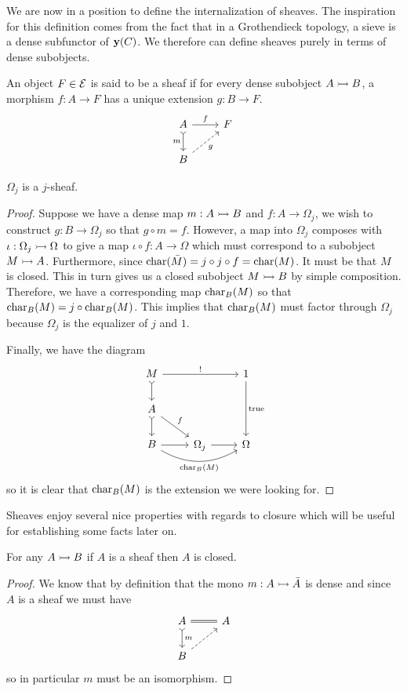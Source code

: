 We are now in a position to define the internalization of sheaves. The
inspiration for this definition comes from the fact that in a
Grothendieck topology, a sieve is a dense subfunctor of
$\mathbf{y}(C)$. We therefore can define sheaves purely in terms of dense
subobjects.

\begin{defn}\label{defn:background:sheaves}
  An object $F \in \mathcal{E}$ is said to be a sheaf if for every dense
  subobject $A \rightarrowtail B$, a morphism $f : A \to F$ has a unique
  extension $g : B \to F$.
  \[
    \begin{tikzcd}
      A \ar[d, rightarrowtail, swap, "m"] \ar[r, "f"] & F\\
      B \ar[ur, dashed, swap, "g"]
    \end{tikzcd}
  \]
\end{defn}
\begin{lem}\label{lem:background:omegajsheaf}
  $\Omega_j$ is a $j$-sheaf.
\end{lem}
\begin{proof}
  Suppose we have a dense map $m : A \rightarrowtail B$ and
  $f : A \to \Omega_j$, we wish to construct $g : B \to \Omega_j$ so
  that $g \circ m = f$. However, a map into $\Omega_j$ composes with
  $\iota : \Omega_j \rightarrowtail \Omega$ to give a map
  $\iota \circ f : A \to \Omega$ which must correspond to a subobject
  $M \rightarrowtail A$. Furthermore, since
  $\operatorname{char}(\bar{M}) = j \circ j \circ f = \operatorname{char}(M)$. It must be that $M$
  is closed. This in turn gives us a closed subobject $M \rightarrowtail B$ by
  simple composition. Therefore, we have a corresponding map
  $\operatorname{char}_B(M)$ so that $\operatorname{char}_B(M) = j \circ \operatorname{char}_B(M)$. This implies
  that $\operatorname{char}_B(M)$ must factor through $\Omega_j$ because $\Omega_j$
  is the equalizer of $j$ and $1$.

  Finally, we have the diagram
  \[
    \begin{tikzcd}
      M \ar[d, rightarrowtail] \ar[rr, "!"] & & 1 \ar[dd, "\true"]\\
      A \ar[d, rightarrowtail] \ar[dr, "f"] & & \\
      B \ar[r] \ar[rr, swap, bend right, "\charmap_B(M)"] & \Omega_j \ar[r] & \Omega
    \end{tikzcd}
  \]
  so it is clear that $\operatorname{char}_B(M)$ is the extension we were looking for.
\end{proof}
Sheaves enjoy several nice properties with regards to closure which
will be useful for establishing some facts later on.
\begin{lem}\label{lem:background:sheavesclosed}
  For any $A \rightarrowtail B$ if $A$ is a sheaf then $A$ is closed.
\end{lem}
\begin{proof}
  We know that by definition that the mono $m : A \rightarrowtail \bar{A}$ is
  dense and since $A$ is a sheaf we must have
  \[
    \begin{tikzcd}
      A \ar[d, rightarrowtail, "m"] \ar[r, equals] & A\\
      B \ar[ur, dashed]
    \end{tikzcd}
  \]
  so in particular $m$ must be an isomorphism.
\end{proof}

